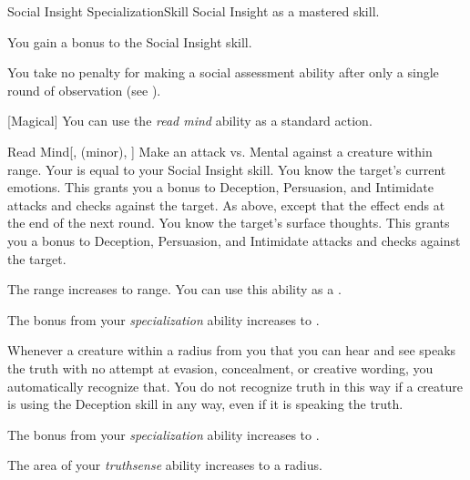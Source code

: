     \begin{feat}{Social Insight Specialization}{Skill}
        \featpre Social Insight as a mastered skill.

         You gain a  bonus to the Social Insight skill.

         You take no penalty for making a social assessment ability after only a single round of observation (see ).

        [Magical] You can use the \textit{read mind} ability as a standard action.
        \begin{freeability}{Read Mind}[,  (minor), ]
            Make an attack vs. Mental against a creature within \rngshort range.
            Your  is equal to your Social Insight skill.
            \hit You know the target's current emotions.
            This grants you a  bonus to Deception, Persuasion, and Intimidate attacks and checks against the target.
            \glance As above, except that the effect ends at the end of the next round.
            \crit You know the target's surface thoughts.
            This grants you a  bonus to Deception, Persuasion, and Intimidate attacks and checks against the target.

            \rankline
             The range increases to \rnglong range.
             You can use this ability as a .
        \end{freeability}

         The bonus from your \textit{specialization} ability increases to .

         Whenever a creature within a \arealarge radius  from you that you can hear and see speaks the truth with no attempt at evasion, concealment, or creative wording, you automatically recognize that.
        You do not recognize truth in this way if a creature is using the Deception skill in any way, even if it is speaking the truth.

         The bonus from your \textit{specialization} ability increases to .

         The area of your \textit{truthsense} ability increases to a \areagarg radius.
    \end{feat}


